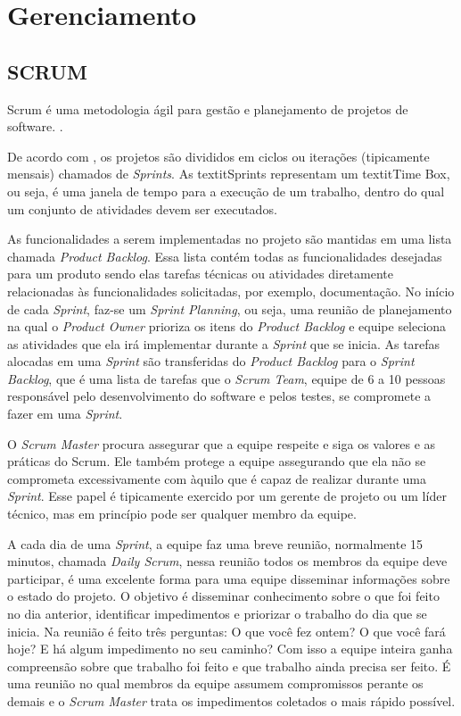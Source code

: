 \section{Gerenciamento}

\subsection{SCRUM}

Scrum é uma metodologia ágil para gestão e planejamento de projetos de software. \cite{scrum}.

De acordo com \cite{scrum}, os projetos são divididos em ciclos ou iterações (tipicamente mensais) chamados de \textit{Sprints}.  As textit{Sprints} representam um textit{Time Box}, ou seja, é uma janela de tempo para a execução de um trabalho, dentro do qual um conjunto de atividades devem ser executados.

As funcionalidades a serem implementadas no projeto são mantidas em uma lista chamada \textit{Product Backlog}. Essa lista contém todas as funcionalidades desejadas para um produto sendo elas tarefas técnicas ou atividades diretamente relacionadas às funcionalidades solicitadas, por exemplo, documentação. No início de cada \textit{Sprint}, faz-se um \textit{Sprint Planning}, ou seja, uma reunião de planejamento na qual o \textit{Product Owner} prioriza os itens do \textit{Product Backlog} e equipe seleciona as atividades que ela irá implementar durante a \textit{Sprint} que se inicia. As tarefas alocadas em uma \textit{Sprint} são transferidas do \textit{Product Backlog} para o \textit{Sprint Backlog}, que é uma lista de tarefas que o \textit{Scrum Team}, equipe de 6 a 10 pessoas responsável pelo desenvolvimento do software e pelos testes, se compromete a fazer em uma \textit{Sprint}. \cite{scrum}

O \textit{Scrum Master} procura assegurar que a equipe respeite e siga os valores e as práticas do Scrum. Ele também protege a equipe assegurando que ela não se comprometa excessivamente com àquilo que é capaz de realizar durante uma \textit{Sprint}. Esse papel é tipicamente exercido por um gerente de projeto ou um líder técnico, mas em princípio pode ser qualquer membro da equipe.

A cada dia de uma \textit{Sprint}, a equipe faz uma breve reunião, normalmente 15 minutos, chamada \textit{Daily Scrum}, nessa reunião todos os membros da equipe deve participar, é uma excelente forma para uma equipe disseminar informações sobre o estado do projeto. O objetivo é disseminar conhecimento sobre o que foi feito no dia anterior, identificar impedimentos e priorizar o trabalho do dia que se inicia. Na reunião é feito três perguntas: O que você fez ontem? O que você fará hoje? E há algum impedimento no seu caminho? Com isso a equipe inteira ganha compreensão sobre que trabalho foi feito e que trabalho ainda precisa ser feito. É uma reunião no qual membros da equipe assumem compromissos perante os demais e o \textit{Scrum Master} trata os impedimentos coletados o mais rápido possível. \cite{scrum}

